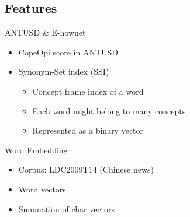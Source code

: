\documentclass[compress]{beamer}
\begin{document}
    \subsection{Features}
        \begin{frame}{\subsecname}
            \begin{block}{ANTUSD \& E-hownet}
                \begin{itemize}
                    \item CopeOpi score in ANTUSD
                    \item Synonym-Set index (SSI)
                        \begin{itemize}
                            \item Concept frame index of a word
                            \item Each word might belong to many concepts
                            \item Represented as a binary vector %
                        \end{itemize}
                    \end{itemize}
                \end{block}
            \pause
            \begin{block}{Word Embedding}
                \begin{itemize}
                    \item Corpus: LDC2009T14 (Chinese news)
                    \item Word vectors %
                    \item Summation of char vectors %
                \end{itemize}
            \end{block}
        \end{frame}
\end{document}
